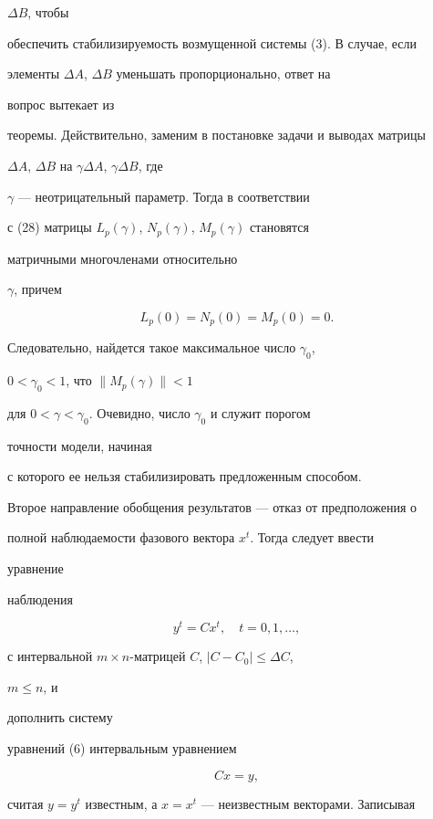 $\Delta B$, чтобы 


обеспечить стабилизируемость возмущенной системы (3). В случае, если 


элементы $\Delta A$, $\Delta B$ уменьшать пропорционально, ответ на 


вопрос вытекает из 


теоремы. Действительно, заменим в постановке задачи и выводах матрицы 


$\Delta A$, $\Delta B$ на $\gamma\Delta A$, $\gamma\Delta B$, где 


$\gamma$ --- неотрицательный параметр. Тогда в соответствии 


с (28) матрицы $L_p(\gamma)$, $N_p(\gamma)$, $M_p(\gamma)$ становятся 


матричными многочленами относительно 


$\gamma$, причем 


$$ 


L_p(0)=N_p(0)=M_p(0)=0. 


$$ 


Следовательно, найдется такое максимальное число $\gamma_0$, 


$0<\gamma_0<1$, что $\|M_p(\gamma)\|<1$ 


для $0<\gamma<\gamma_0$. Очевидно, число $\gamma_0$ и служит порогом 


точности модели, начиная 


с которого ее нельзя стабилизировать предложенным способом. 


 


Второе направление обобщения результатов --- отказ от предположения о 


полной наблюдаемости фазового вектора $x^t$. Тогда следует ввести 


уравнение 


наблюдения 


$$ 


y^t=C x^t,\quad t=0,1,\dotsc, 


$$ 


с интервальной $m\times n$-матрицей $C$, $|C-C_0|\le\Delta C$, 


$m\le n$, и 


дополнить систему 


уравнений (6) интервальным уравнением 


$$ 


C x=y, 


$$ 


считая $y=y^t$ известным, а $x=x^t$ --- неизвестным векторами. Записывая 


